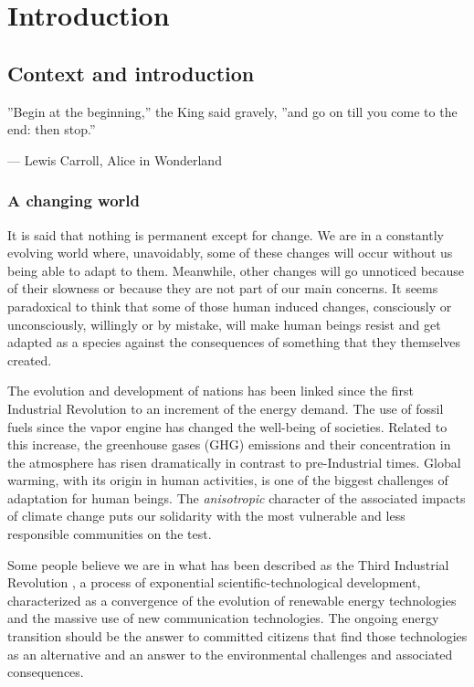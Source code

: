 \part{Introduction\label{cha:intro}}

\chapter{Context and introduction\label{context}}

\epigraphfontsize{\small\itshape}
\epigraph{''Begin at the beginning,'' the King said gravely, ''and go on till you
come to the end: then stop.''}{--- \textup{Lewis Carroll}, Alice in Wonderland}

\section{A changing world} 

It is said that nothing is permanent except for change. We are in a constantly evolving world where, unavoidably, some of these changes will occur without us being able to adapt to them. Meanwhile, other changes will go unnoticed because of their slowness or because they are not part of our main concerns. It seems paradoxical to think that some of those human induced changes, consciously or unconsciously, willingly or by mistake, will make human beings resist and get adapted as a species against the consequences of something that they themselves created. 

The evolution and development of nations has been linked since the first Industrial Revolution to an increment of the energy demand. The use of fossil fuels since the vapor engine has changed the well-being of societies. Related to this increase, the greenhouse gases (GHG) emissions and their concentration in the atmosphere has risen dramatically in contrast to pre-Industrial times. Global warming, with its origin in human activities, is one of the biggest challenges of adaptation for human beings. The \textit{anisotropic} character of the associated impacts of climate change puts our solidarity with the most vulnerable and less responsible communities on the test.


Some people believe we are in what has been described as the Third Industrial Revolution \cite*{Rifkin2012}, a process of exponential scientific-technological development, characterized as a convergence of the evolution of renewable energy technologies and the massive use of new communication technologies. The ongoing energy transition should be the answer to committed citizens that find those technologies as an alternative and an answer to the environmental challenges and associated consequences.     

